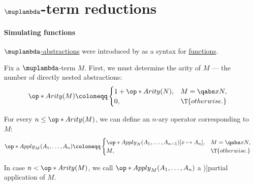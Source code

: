 \section{\texorpdfstring{\( \muplambda \)}{λ}-term reductions}\label{sec:lambda_term_reductions}

\paragraph{Simulating functions}

\begin{algorithm}\label{alg:untyped_lambda_term_to_function}
  \hyperref[def:lambda_term]{\( \muplambda \)-abstractions} were introduced by \textcite[352]{Church1932LambdaCalculus} as a syntax for \hyperref[def:function]{functions}.

  Fix a \( \muplambda \)-term \( M \). First, we must determine the arity of \( M \) --- the number of directly nested abstractions:
  \begin{equation}\label{eq:alg:untyped_lambda_term_to_function/arity}
    \op*{Arity}(M) \coloneqq \begin{cases}
      1 + \op*{Arity}(N), &M = \qabs x N, \\
      0,                  &\T{otherwise.}
    \end{cases}
  \end{equation}

  For every \( n \leq \op*{Arity}(M) \), we can define an \( n \)-ary operator corresponding to \( M \):
  \begin{equation}\label{eq:alg:untyped_lambda_term_to_function/apply}
    \op*{Apply}_M(A_1, \ldots, A_n) \coloneqq \begin{cases}
      \op*{Apply}_N(A_1, \ldots, A_{n-1})[x \mapsto A_n], &M = \qabs x N, \\
      M,                                                  &\T{otherwise.}
    \end{cases}
  \end{equation}

  In case \( n < \op*{Arity}(M) \), we call \( \op*{Apply}_M(A_1, \ldots, A_n) \) a \term[en=partial application (\cite[21]{Mimram2020ProgramEqualsProof})]{partial application} of \( M \).
\end{algorithm}
